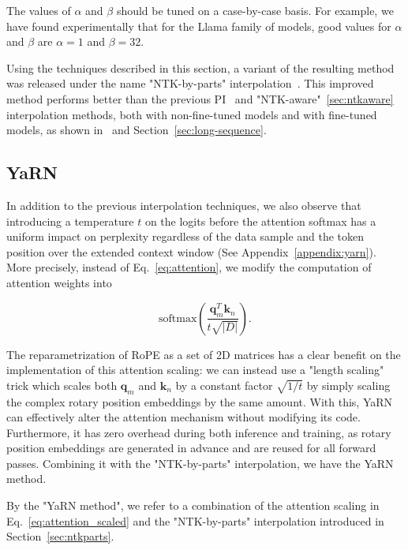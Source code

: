 The values of $\alpha$ and $\beta$ should be tuned on a case-by-case basis. For example, we have found experimentally that for the Llama family of models, good values for $\alpha$ and $\beta$ are $\alpha = 1$ and $\beta = 32$.

Using the techniques described in this section, a variant of the resulting method was released under the name "NTK-by-parts" interpolation~\citep{blocntkparts}. This improved method performs better than the previous PI~\citep{chen2023extending} and "NTK-aware"~\ref{sec:ntkaware} interpolation methods, both with non-fine-tuned models and with fine-tuned models, as shown in~\citep{blocntkparts} and Section~\ref{sec:long-sequence}.

\subsection{YaRN}\label{sec:yarn}

In addition to the previous interpolation techniques, we also observe that introducing a temperature $t$ on the logits before the attention softmax has a uniform impact on perplexity regardless of the data sample and the token position over the extended context window (See Appendix~\ref{appendix:yarn}). More precisely, instead of Eq.~\ref{eq:attention}, we modify the computation of attention weights into

\begin{equation}\label{eq:attention_scaled}
\text{softmax}\left(\dfrac{{\bm{q}}_m^T{\bm{k}}_n}{t\sqrt{|D|}}\right).
\end{equation}

The reparametrization of RoPE as a set of 2D matrices has a clear benefit on the implementation of this attention scaling:  we can instead use a "length scaling" trick which scales both ${\bm{q}}_m$ and ${\bm{k}}_n$ by a constant factor $\sqrt{1/t}$ by simply scaling the complex rotary position embeddings by the same amount. With this, YaRN can effectively alter the attention mechanism without modifying its code. Furthermore, it has zero overhead during both inference and training, as rotary position embeddings are generated in advance and are reused for all forward passes. Combining it with the "NTK-by-parts" interpolation, we have the YaRN method.

\begin{definition}
    By the "YaRN method", we refer to a combination of the attention scaling in Eq.~\ref{eq:attention_scaled} and the "NTK-by-parts" interpolation introduced in Section~\ref{sec:ntkparts}.
\end{definition}

